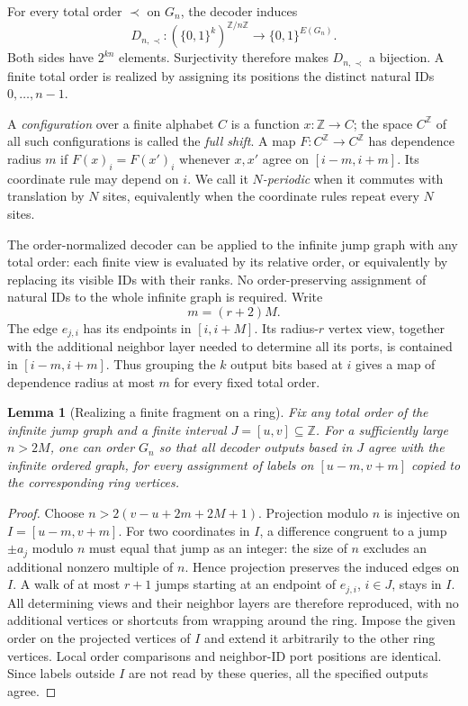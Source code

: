 \documentclass[11pt]{article}
\newtheorem{lemma}[theorem]{Lemma}
\theoremstyle{definition}
\theoremstyle{remark}
\newcommand{\bits}{\{0,1\}}
\begin{document}
For every total order $\prec$ on $G_n$, the decoder induces
\[
 D_{n,\prec}:(\bits^k)^{\mathbb Z/n\mathbb Z}
     \longrightarrow\bits^{E(G_n)}.                        \tag{11.3}
\]
Both sides have $2^{kn}$ elements.  Surjectivity therefore makes
$D_{n,\prec}$ a bijection.  A finite total order is realized by assigning
its positions the distinct natural IDs $0,\ldots,n-1$.

A \emph{configuration} over a finite alphabet $C$ is a function
$x:\mathbb Z\to C$; the space $C^{\mathbb Z}$ of all such configurations
is called the \emph{full shift}.  A map $F:C^{\mathbb Z}\to C^{\mathbb Z}$ has
dependence radius $m$ if $F(x)_i=F(x')_i$ whenever $x,x'$ agree on
$[i-m,i+m]$.  Its coordinate rule may depend on $i$.  We call it
\emph{$N$-periodic} when it commutes with translation by $N$ sites,
equivalently when the coordinate rules repeat every $N$ sites.

The order-normalized decoder can be applied to the infinite jump graph
with any total order: each finite view is evaluated by its relative order,
or equivalently by replacing its visible IDs with their ranks.
No order-preserving assignment of natural IDs to the whole infinite graph
is required.  Write
\[
                         m=(r+2)M.
\]
The edge $e_{j,i}$ has its endpoints in $[i,i+M]$.
Its radius-$r$ vertex view, together with the additional neighbor layer
needed to determine all its ports, is contained in $[i-m,i+m]$.
Thus grouping the $k$ output bits based at $i$ gives a map of dependence
radius at most $m$ for every fixed total order.

\begin{lemma}[Realizing a finite fragment on a ring]
\label{lem:finite-fragment}
Fix any total order of the infinite jump graph and a finite interval
$J=[u,v]\subseteq\mathbb Z$.  For a sufficiently large $n>2M$, one can order
$G_n$ so that all decoder outputs based in $J$ agree with the infinite
ordered graph, for every assignment of labels on $[u-m,v+m]$
copied to the corresponding ring vertices.
\end{lemma}

\begin{proof}
Choose $n>2(v-u+2m+2M+1)$.  Projection modulo $n$ is injective on
$I=[u-m,v+m]$.  For two coordinates in $I$, a difference congruent to a
jump $\pm a_j$ modulo $n$ must equal that jump as an integer: the size of
$n$ excludes an additional nonzero multiple of $n$.  Hence projection
preserves the induced edges on $I$.  A walk of at most $r+1$ jumps
starting at an endpoint of $e_{j,i}$, $i\in J$, stays in $I$.
All determining views and their neighbor layers are therefore reproduced,
with no additional vertices or shortcuts from wrapping around the ring.
Impose the given order on the projected vertices of $I$ and extend it
arbitrarily to the other ring vertices.  Local order comparisons and
neighbor-ID port positions are identical.  Since labels outside $I$
are not read by these queries, all the specified outputs agree.
\end{proof}
\end{document}
